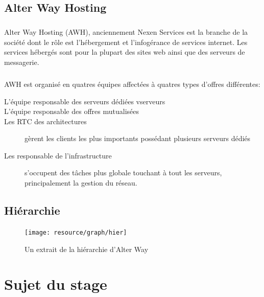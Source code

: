 \section{Alter Way Hosting}
\paragraph*{}
Alter Way Hosting (AWH), anciennement Nexen Services est la branche de la société dont le rôle est l'hébergement et l'infogérance de services internet.
Les services hébergés sont pour la plupart des sites web ainsi que des serveurs de messagerie.

\paragraph*{}
AWH est organisé en quatres équipes affectées à quatres types d'offres différentes:

\begin{description}
	\item[L'équipe responsable des serveurs dédiées vserveurs \footnotemark]
	\item[L'équipe responsable des offres mutualisées
		\footnotemark] 
	\item[Les RTC \footnotemark des architectures] 
		gèrent les clients les plus importants possédant plusieurs serveurs dédiés
	\item[Les responsable de l'infrastructure] s'occupent des tâches plus globale touchant à tout les serveurs,
		principalement la gestion du réseau.

\end{description}


\section{Hiérarchie}

\begin{figure}[H]
	\centering
	\texttt{[image: resource/graph/hier]}
	\caption{Un extrait de la hiérarchie d'Alter Way}
\end{figure}

\chapter{Sujet du stage}


